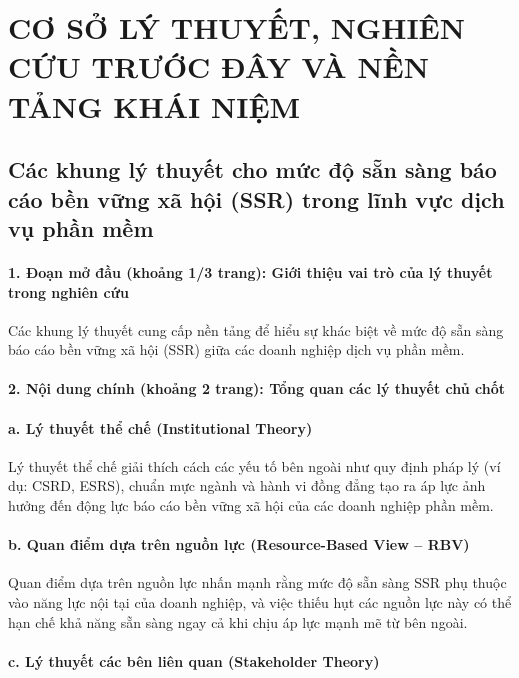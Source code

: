 \chapter{CƠ SỞ LÝ THUYẾT, NGHIÊN CỨU TRƯỚC ĐÂY VÀ NỀN TẢNG KHÁI NIỆM}

\section{Các khung lý thuyết cho mức độ sẵn sàng báo cáo bền vững xã hội (SSR) trong lĩnh vực dịch vụ phần mềm}

\subsubsection{1. Đoạn mở đầu (khoảng 1/3 trang): Giới thiệu vai trò của lý thuyết trong nghiên cứu}

Các khung lý thuyết cung cấp nền tảng để hiểu sự khác biệt về mức độ sẵn sàng báo cáo bền vững xã hội (SSR) giữa các doanh nghiệp dịch vụ phần mềm.

\subsubsection{2. Nội dung chính (khoảng 2 trang): Tổng quan các lý thuyết chủ chốt}

\vspace{8pt}
\subsubsection{a. Lý thuyết thể chế (Institutional Theory)}

Lý thuyết thể chế \parencite{DiMaggio1983} giải thích cách các yếu tố bên ngoài như quy định pháp lý (ví dụ: CSRD, ESRS), chuẩn mực ngành và hành vi đồng đẳng tạo ra áp lực ảnh hưởng đến động lực báo cáo bền vững xã hội của các doanh nghiệp phần mềm.

\subsubsection{b. Quan điểm dựa trên nguồn lực (Resource-Based View – RBV)}

Quan điểm dựa trên nguồn lực \parencite{Barney1991} nhấn mạnh rằng mức độ sẵn sàng SSR phụ thuộc vào năng lực nội tại của doanh nghiệp, và việc thiếu hụt các nguồn lực này có thể hạn chế khả năng sẵn sàng ngay cả khi chịu áp lực mạnh mẽ từ bên ngoài.

\subsubsection{c. Lý thuyết các bên liên quan (Stakeholder Theory)}

